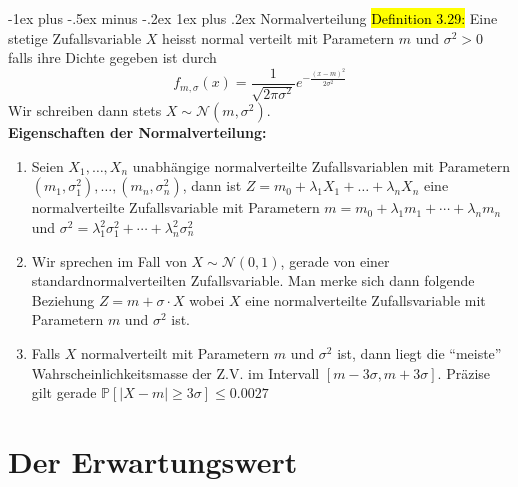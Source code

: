 \documentclass[10pt,landscape]{article}
\makeatletter
\newcommand{\blue}[1]{\sethlcolor{cyan} \hl{#1}}
\renewcommand{\subsubsection}{\@startsection{subsubsection}{3}{0mm}%
                                {-1ex plus -.5ex minus -.2ex}%
                                {1ex plus .2ex}%
                                {\normalfont\small\bfseries}}
\makeatother
\begin{document}
\begin{multicols}{3}
\subsubsection{Normalverteilung}
\blue{Definition 3.29:} Eine stetige Zufallsvariable $X$ heisst normal verteilt mit Parametern $m$ und $\sigma^{2}>0$ falls ihre Dichte gegeben ist durch
$$
f_{m, \sigma}(x)=\frac{1}{\sqrt{2 \pi \sigma^{2}}} e^{-\frac{(x-m)^{2}}{2 \sigma^{2}}}
$$
Wir schreiben dann stets $X \sim \mathcal{N}\left(m, \sigma^{2}\right)$.\\
\textbf{Eigenschaften der Normalverteilung:}
\begin{enumerate}
    \item Seien $X_{1}, \ldots, X_{n}$ unabhängige normalverteilte Zufallsvariablen mit Parametern $\left(m_{1}, \sigma_{1}^{2}\right), \ldots,\left(m_{n}, \sigma_{n}^{2}\right)$, dann ist
    $Z=m_{0}+\lambda_{1} X_{1}+\ldots+\lambda_{n} X_{n}$
    eine normalverteilte Zufallsvariable mit Parametern $m=m_{0}+\lambda_{1} m_{1}+\cdots+\lambda_{n} m_{n}$ und $\sigma^{2}=\lambda_{1}^{2} \sigma_{1}^{2}+\cdots+\lambda_{n}^{2} \sigma_{n}^{2}$
    \item Wir sprechen im Fall von $X \sim \mathcal{N}(0,1)$, gerade von einer standardnormalverteilten Zufallsvariable. Man merke sich dann folgende Beziehung
    $Z=m+\sigma \cdot X$
    wobei $X$ eine normalverteilte Zufallsvariable mit Parametern $m$ und $\sigma^{2}$ ist.
    \item Falls $X$ normalverteilt mit Parametern $m$ und $\sigma^{2}$ ist, dann liegt die ``meiste'' Wahrscheinlichkeitsmasse der Z.V. im Intervall $[m-3 \sigma, m+3 \sigma]$. Präzise gilt gerade
    $\mathbb{P}[|X-m| \geq 3 \sigma] \leq 0.0027$
\end{enumerate}
\section{Der Erwartungswert}

\end{multicols}
\end{document}

